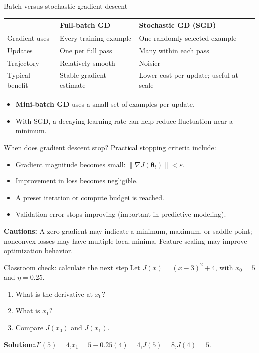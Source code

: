 \documentclass[aspectratio=169,11pt]{beamer}
\begin{document}
\begin{frame}{Batch versus stochastic gradient descent}
\begin{tabular}{p{}p{}p{}}
\toprule
 & Full-batch GD & Stochastic GD (SGD)\\
\midrule
Gradient uses & Every training example & One randomly selected example\\[5pt]
Updates & One per full pass & Many within each pass\\[5pt]
Trajectory & Relatively smooth & Noisier\\[5pt]
Typical benefit & Stable gradient estimate & Lower cost per update; useful at scale\\
\bottomrule
\end{tabular}
\vspace{0.5cm}
\begin{itemize}
\item \textbf{Mini-batch GD} uses a small set of examples per update.
\item With SGD, a decaying learning rate can help reduce fluctuation near a minimum.
\end{itemize}
\end{frame}

\begin{frame}{When does gradient descent stop?}
Practical stopping criteria include:
\begin{itemize}
\item Gradient magnitude becomes small: $\|\nabla J(\boldsymbol\theta_t)\|<\varepsilon$.
\item Improvement in loss becomes negligible.
\item A preset iteration or compute budget is reached.
\item Validation error stops improving (important in predictive modeling).
\end{itemize}
\vspace{0.2cm}
\textbf{Cautions:} A zero gradient may indicate a minimum, maximum, or saddle point; nonconvex losses may have multiple local minima. Feature scaling may improve optimization behavior.
\end{frame}

\begin{frame}{Classroom check: calculate the next step}
Let $J(x)=(x-3)^2+4$, with $x_0=5$ and $\eta=0.25$.
\begin{enumerate}
\item What is the derivative at $x_0$?
\item What is $x_1$?
\item Compare $J(x_0)$ and $J(x_1)$.
\end{enumerate}
\vspace{0.5cm}
\textbf{Solution:}\quad $J'(5)=4$,\quad $x_1=5-0.25(4)=4$,\quad $J(5)=8$,\quad $J(4)=5$.
\end{frame}
\end{document}
